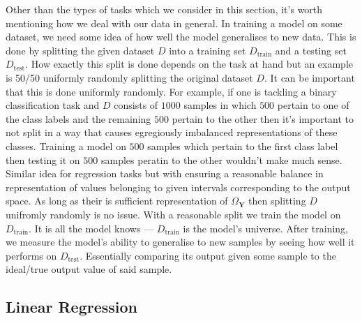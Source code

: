 \documentclass[11pt]{article}
\begin{document}
Other than the types of tasks which we consider in this section, it's worth mentioning how we deal with our data in general. In training a model on some dataset, we need some idea of how well the model generalises to new data. This is done by splitting the given dataset $D$ into a training set $D_{\text{train}}$ and a testing set $D_{\text{test}}$. How exactly this split is done depends on the task at hand but an example is 50/50 uniformly randomly splitting the original dataset $D$. It can be important that this is done uniformly randomly. For example, if one is tackling a binary classification task and $D$ consists of $1000$ samples in which $500$ pertain to one of the class labels and the remaining $500$ pertain to the other then it's important to not split in a way that causes egregiously imbalanced representations of these classes. Training a model on $500$ samples which pertain to the first class label then testing it on $500$ samples peratin to the other wouldn't make much sense. Similar idea for regression tasks but with ensuring a reasonable balance in representation of values belonging to given intervals corresponding to the output space. As long as their is sufficient representation of $\Omega_{\mathbf{Y}}$ then splitting $D$ unifromly randomly is no issue. With a reasonable split we train the model on $D_{\text{train}}$. It is all the model knows — $D_{\text{train}}$ is the model's universe. After training, we measure the model's ability to generalise to new samples by seeing how well it performs on $D_{\text{test}}$. Essentially comparing its output given some sample to the ideal/true output value of said sample.

\subsection{Linear Regression}
\end{document}
